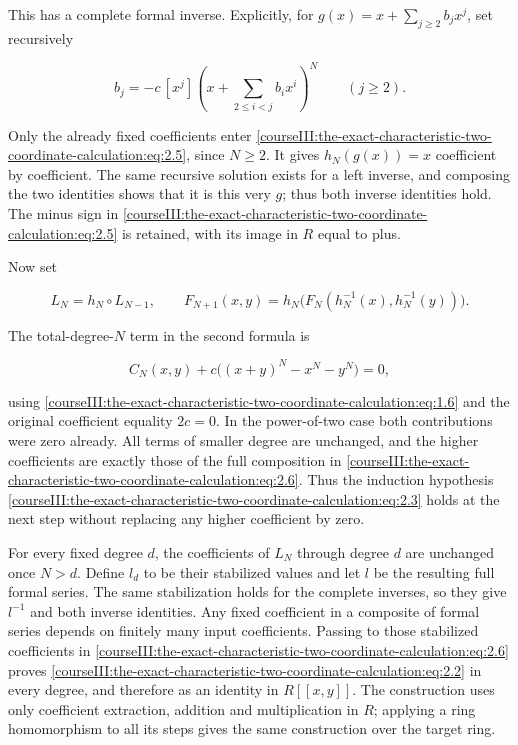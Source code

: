 This has a complete formal inverse. Explicitly, for \(g(x)=x+\sum_{j\geq2}b_jx^j\), set recursively

\begin{equation}
b_j=-c\,[x^j]\left(x+\sum_{2\leq i<j}b_ix^i\right)^N\qquad(j\geq2).
 \label{courseIII:the-exact-characteristic-two-coordinate-calculation:eq:2.5}
\end{equation}

Only the already fixed coefficients enter \eqref{courseIII:the-exact-characteristic-two-coordinate-calculation:eq:2.5}, since \(N\geq2\). It gives \(h_N(g(x))=x\) coefficient by coefficient. The same recursive solution exists for a left inverse, and composing the two identities shows that it is this very \(g\); thus both inverse identities hold. The minus sign in \eqref{courseIII:the-exact-characteristic-two-coordinate-calculation:eq:2.5} is retained, with its image in \(R\) equal to plus.

Now set

\begin{equation}
L_N=h_N\circ L_{N-1},\qquad
 F_{N+1}(x,y)=h_N\bigl(F_N(h_N^{-1}(x),h_N^{-1}(y))\bigr).
 \label{courseIII:the-exact-characteristic-two-coordinate-calculation:eq:2.6}
\end{equation}

The total-degree-\(N\) term in the second formula is

\begin{equation}
C_N(x,y)+c\bigl((x+y)^N-x^N-y^N\bigr)=0,
 \label{courseIII:the-exact-characteristic-two-coordinate-calculation:eq:2.7}
\end{equation}

using \eqref{courseIII:the-exact-characteristic-two-coordinate-calculation:eq:1.6} and the original coefficient equality \(2c=0\). In the power-of-two case both contributions were zero already. All terms of smaller degree are unchanged, and the higher coefficients are exactly those of the full composition in \eqref{courseIII:the-exact-characteristic-two-coordinate-calculation:eq:2.6}. Thus the induction hypothesis \eqref{courseIII:the-exact-characteristic-two-coordinate-calculation:eq:2.3} holds at the next step without replacing any higher coefficient by zero.

For every fixed degree \(d\), the coefficients of \(L_N\) through degree \(d\) are unchanged once \(N>d\). Define \(l_d\) to be their stabilized values and let \(l\) be the resulting full formal series. The same stabilization holds for the complete inverses, so they give \(l^{-1}\) and both inverse identities. Any fixed coefficient in a composite of formal series depends on finitely many input coefficients. Passing to those stabilized coefficients in \eqref{courseIII:the-exact-characteristic-two-coordinate-calculation:eq:2.6} proves \eqref{courseIII:the-exact-characteristic-two-coordinate-calculation:eq:2.2} in every degree, and therefore as an identity in \(R[[x,y]]\). The construction uses only coefficient extraction, addition and multiplication in \(R\); applying a ring homomorphism to all its steps gives the same construction over the target ring.

